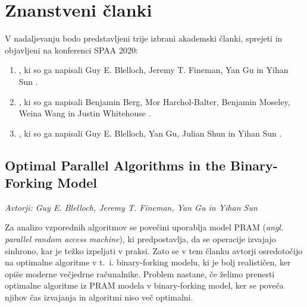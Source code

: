 \documentclass[a4paper,11pt]{article}
\begin{document}

\section{Znanstveni članki}

V nadaljevanju bodo predstavljeni trije izbrani akademski članki, sprejeti in objavljeni na konferenci SPAA 2020:
\begin{enumerate}
    \item \textit{}, ki so ga napisali Guy E. Blelloch, Jeremy T. Fineman, Yan Gu in Yihan Sun \cite{bib:clanek1}.
    \item \textit{}, ki so ga napisali Benjamin Berg, Mor Harchol-Balter, Benjamin Moseley, Weina Wang in Justin Whitehouse \cite{bib:clanek2}.
    \item \textit{}, ki so ga napisali Guy E. Blelloch, Yan Gu, Julian Shun in Yihan Sun \cite{bib:clanek3}.
\end{enumerate}


\subsection{Optimal Parallel Algorithms in the Binary-Forking Model}

\begin{minipage}{0.35\textwidth}
    \centering
\end{minipage}\hfill
\begin{minipage}{0.65\textwidth}   
    \textit{Avtorji: Guy E. Blelloch, Jeremy T. Fineman, Yan Gu in Yihan Sun}
    \\
\end{minipage}\hfill

\noindent
Za analizo vzporednih algoritmov se povečini uporablja model PRAM (\textit{angl. parallel random access machine}), ki predpostavlja, da se operacije izvajajo sinhrono, kar je težko izpeljati v praksi. 
Zato se v tem članku avtorji osredotočijo na optimalne algoritme v t.~i. binary-forking modelu, ki je bolj realističen, ker opiše moderne večjedrne računalnike. 
Problem nastane, če želimo prenesti optimalne algoritme iz PRAM modela v binary-forking model, ker se poveča njihov čas izvajanja in algoritmi niso več optimalni.
\end{document}
